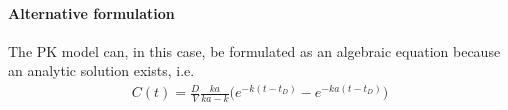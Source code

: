 \paragraph{Alternative formulation}
The PK model can, in this case, be formulated as an algebraic equation because an analytic solution exists, i.e.
\begin{align*}
C(t) = \frac{D}{V}  \frac{ka}{ka - k} \Big(e^{-k(t-t_D)} - e^{-ka(t-t_D)} \Big) 
\end{align*}


%
%
%

